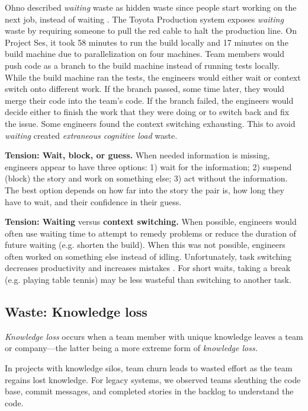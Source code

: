 Ohno described \textit{waiting} waste as hidden waste since people start working on the next job, instead of waiting \cite{OhnoToyotaProductionSystem}. The Toyota Production system exposes \textit{waiting} waste by requiring someone to pull the red cable to halt the production line. On Project Ses, it took 58 minutes to run the build locally and 17 minutes on the build machine due to parallelization on four machines. Team members would push code as a branch to the build machine instead of running tests locally. While the build machine ran the tests, the engineers would either wait or context switch onto different work. If the branch passed, some time later, they would merge their code into the team's code. If the branch failed, the engineers would decide either to finish the work that they were doing or to switch back and fix the issue. Some engineers found the context switching exhausting. This  to avoid \textit{waiting} created \textit{extraneous cognitive load} waste.

\textbf{Tension: Wait, block, or guess.}
When needed information is missing, engineers appear to have three options: 1) wait for the information; 2) suspend (block) the story and work on something else; 3) act without the information. The best option depends on how far into the story the pair is, how long they have to wait, and their confidence in their guess.

\textbf{Tension: Waiting} versus \textbf{context switching.}
When possible, engineers would often use waiting time to attempt to remedy problems or reduce the duration of future waiting (e.g. shorten the build). When this was not possible, engineers often worked on something else instead of idling. Unfortunately, task switching decreases productivity and increases mistakes \cite{MonsellTaskSwitching}. For short waits, taking a break (e.g. playing table tennis) may be less wasteful than switching to another task. 

\subsection{Waste: Knowledge loss}
\textit{Knowledge loss} occurs when a team member with unique knowledge leaves a team or company---the latter being a more extreme form of \textit{knowledge loss.}

In projects with knowledge silos, team churn leads to wasted effort as the team regains lost knowledge. For legacy systems, we observed teams sleuthing the code base, commit messages, and completed stories in the backlog to understand the code.  

